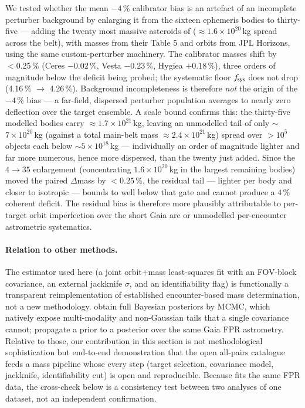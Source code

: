 \documentclass{aa}
\begin{document}
We tested whether the mean $-4$\,\% calibrator bias is an artefact of an
incomplete perturber background by enlarging it from the sixteen ephemeris
bodies to thirty-five --- adding the twenty most massive asteroids of
\citet{fuentesmunoz2025} ($\approx1.6\times10^{20}$\,kg spread across the belt),
with masses from their Table 5 and orbits from JPL Horizons, using the same
custom-perturber machinery. The calibrator masses shift by $<0.25$\,\% (Ceres
$-0.02$\,\%, Vesta $-0.23$\,\%, Hygiea $+0.18$\,\%), three orders of magnitude
below the deficit being probed; the systematic floor $f_{\rm sys}$ does not drop
(4.16\,\% $\to$ 4.26\,\%). Background incompleteness is therefore \emph{not} the
origin of the $-4$\,\% bias --- a far-field, dispersed perturber population
averages to nearly zero deflection over the target ensemble. A scale bound
confirms this: the thirty-five modelled bodies carry $\approx1.7\times10^{21}$\,kg,
leaving an unmodelled tail of only $\sim$$7\times10^{20}$\,kg (against a total
main-belt mass $\approx2.4\times10^{21}$\,kg) spread over $>10^{5}$ objects each
below $\sim$$5\times10^{18}$\,kg --- individually an order of magnitude lighter
and far more numerous, hence more dispersed, than the twenty just added. Since
the $4\to35$ enlargement (concentrating $1.6\times10^{20}$\,kg in the largest
remaining bodies) moved the paired $\Delta$mass by $<0.25$\,\%, the residual tail
--- lighter per body and closer to isotropic --- bounds to well below that gate
and cannot produce a $4$\,\% coherent deficit. The residual bias is therefore
more plausibly attributable to per-target orbit imperfection over the short Gaia
arc or unmodelled per-encounter astrometric systematics.

\paragraph{Relation to other methods.} The estimator used here (a joint
orbit$+$mass least-squares fit with an FOV-block covariance, an external
jackknife $\sigma$, and an identifiability flag) is functionally a transparent
reimplementation of established encounter-based mass determination, not a new
methodology. \citet{siltala2020} obtain full Bayesian posteriors by MCMC, which
natively expose multi-modality and non-Gaussian tails that a single covariance
cannot; \citet{fuentesmunoz2025} propagate a prior to a posterior over the same
Gaia FPR astrometry. Relative to those, our contribution in this section is not
methodological sophistication but end-to-end demonstration that the open
all-pairs catalogue feeds a mass pipeline whose every step (target selection,
covariance model, jackknife, identifiability cut) is open and reproducible.
Because \citet{fuentesmunoz2025} fits the same FPR data, the cross-check below is
a consistency test between two analyses of one dataset, not an independent
confirmation.
\end{document}
